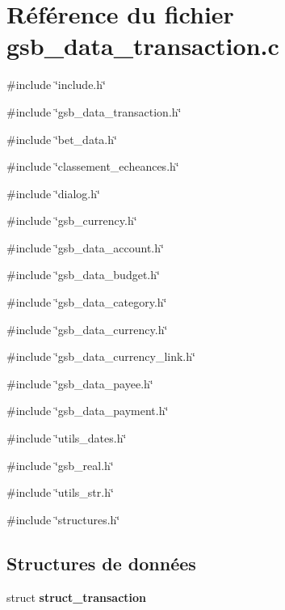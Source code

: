 \section{Référence du fichier gsb\_\-data\_\-transaction.c}
\label{gsb__data__transaction_8c}
{\ttfamily \#include \char`\"{}include.h\char`\"{}}\par
{\ttfamily \#include \char`\"{}gsb\_\-data\_\-transaction.h\char`\"{}}\par
{\ttfamily \#include \char`\"{}bet\_\-data.h\char`\"{}}\par
{\ttfamily \#include \char`\"{}classement\_\-echeances.h\char`\"{}}\par
{\ttfamily \#include \char`\"{}dialog.h\char`\"{}}\par
{\ttfamily \#include \char`\"{}gsb\_\-currency.h\char`\"{}}\par
{\ttfamily \#include \char`\"{}gsb\_\-data\_\-account.h\char`\"{}}\par
{\ttfamily \#include \char`\"{}gsb\_\-data\_\-budget.h\char`\"{}}\par
{\ttfamily \#include \char`\"{}gsb\_\-data\_\-category.h\char`\"{}}\par
{\ttfamily \#include \char`\"{}gsb\_\-data\_\-currency.h\char`\"{}}\par
{\ttfamily \#include \char`\"{}gsb\_\-data\_\-currency\_\-link.h\char`\"{}}\par
{\ttfamily \#include \char`\"{}gsb\_\-data\_\-payee.h\char`\"{}}\par
{\ttfamily \#include \char`\"{}gsb\_\-data\_\-payment.h\char`\"{}}\par
{\ttfamily \#include \char`\"{}utils\_\-dates.h\char`\"{}}\par
{\ttfamily \#include \char`\"{}gsb\_\-real.h\char`\"{}}\par
{\ttfamily \#include \char`\"{}utils\_\-str.h\char`\"{}}\par
{\ttfamily \#include \char`\"{}structures.h\char`\"{}}\par
\subsection*{Structures de données}
\begin{DoxyCompactItemize}
\item 
struct {\bf struct\_\-transaction}
\end{DoxyCompactItemize}
